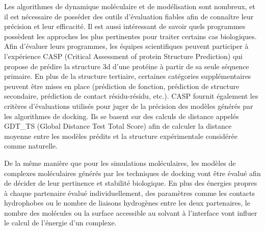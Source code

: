 Les algorithmes de dynamique moléculaire et de modélisation sont nombreux, et il est nécessaire de posséder des outils d'évaluation fiables afin de connaître leur précision et leur efficacité. Il est aussi intéressant de savoir quels programmes possèdent les approches les plus pertinentes pour traiter certains cas biologiques. Afin d'évaluer leurs programmes, les équipes scientifiques peuvent participer à l'expérience CASP (Critical Assessment of protein Structure Prediction) qui propose de prédire la structure 3d d'une protéine à partir de sa seule séquence primaire. En plus de la structure tertiaire, certaines catégories supplémentaires peuvent être mises en place (prédiction de fonction, prédiction de structure secondaire, prédiction de contact résidu-résidu, etc.). CASP fournit également les critères d'évaluations utilisés pour juger de la précision des modèles générés par les algorithmes de docking. Ils se basent sur des calculs de distance appelés GDT\_TS (Global Distance Test Total Score) afin de calculer la distance moyenne entre les modèles prédits et la structure expérimentale considérée comme naturelle. 

De la même manière que pour les simulations moléculaires, les modèles de complexes moléculaires générés par les techniques de docking vont être évalué afin de décider de leur pertinence et stabilité biologique.
En plus des énergies propres à chaque partenaire évalué individuellement, des paramètres comme les contacts hydrophobes ou le nombre de liaisons hydrogènes entre les deux partenaires, le nombre des molécules ou la surface accessible au solvant à l'interface vont influer le calcul de l'énergie d'un complexe. 


